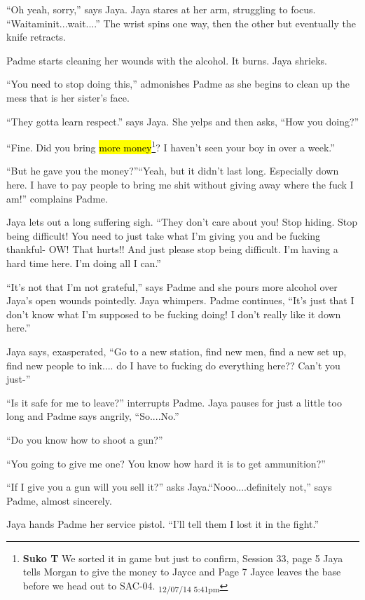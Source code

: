 ``Oh yeah, sorry,'' says Jaya. Jaya stares at her arm, struggling to focus.  ``Waitaminit...wait....'' The wrist spins one way, then the other but eventually the knife retracts.

Padme starts cleaning her wounds with the alcohol.  It burns.  Jaya shrieks.

``You need to stop doing this,'' admonishes Padme as she begins to clean up the mess that is her sister's face.

``They gotta learn respect.'' says Jaya.  She yelps and then asks, ``How you doing?''

``Fine.  Did you bring \hl{more money}\footnote{\textbf{Suko T }We sorted it in game but just to confirm, Session 33, page 5 Jaya tells Morgan to give the money to Jayce and Page 7 Jayce leaves the base before we head out to SAC-04. \textsubscript{12/07/14 5:41pm}}?  I haven't seen your boy in over a week.''

``But he gave you the money?''``Yeah, but it didn't last long.  Especially down here.  I have to pay people to bring me shit without giving away where the fuck I am!'' complains Padme.

Jaya lets out a long suffering sigh. ``They don't care about you!  Stop hiding. Stop being difficult! You need to just take what I'm giving you and be fucking thankful- OW!  That hurts!!  And just please stop being difficult.  I'm having a hard time here.  I'm doing all I can.''

``It's not that I'm not grateful,'' says Padme and she pours more alcohol over Jaya's open wounds pointedly.  Jaya whimpers.  Padme continues, ``It's just that I don't know what I'm supposed to be fucking doing!  I don't really like it down here.''

Jaya says, exasperated, ``Go to a new station, find new men, find a new set up, find new people to ink.... do I have to fucking do everything here??  Can't you just-''

``Is it safe for me to leave?''  interrupts Padme.  Jaya pauses for just a little too long and Padme says angrily, ``So....No.'' 

``Do you know how to shoot a gun?''

``You going to give me one?  You know how hard it is to get ammunition?''

``If I give you a gun will you sell it?'' asks Jaya.``Nooo....definitely not,'' says Padme, almost sincerely.

Jaya hands Padme her service pistol. ``I'll tell them I lost it in the fight.''

